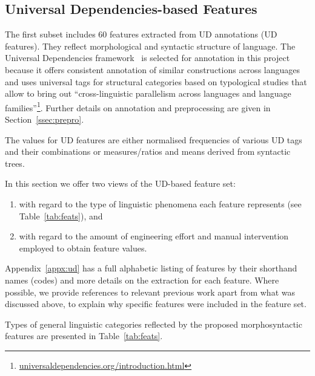 \subsection{\label{ssec:ud}Universal Dependencies-based Features}

The first subset includes 60 features extracted from \gls{UD} annotations (UD features). They reflect morphological and syntactic structure of language.
The Universal Dependencies framework~\cite{Straka2017} is selected for annotation in this project because it offers consistent annotation of similar constructions across languages and uses universal tags for structural categories based on typological studies that allow to bring out ``cross-linguistic parallelism across languages and language families''\footnote{\url{universaldependencies.org/introduction.html}}. Further details on annotation and preprocessing are given in Section~\ref{ssec:prepro}. 

The values for UD features are either normalised frequencies of various UD tags and their combinations or measures/ratios and means derived from syntactic trees. 

In this section we offer two views of the UD-based feature set: 
\begin{enumerate}\compresslist{}
	\item with regard to the type of linguistic phenomena each feature represents (see Table~\ref{tab:feats}), and 
	\item with regard to the amount of engineering effort and manual intervention employed to obtain feature values. 
\end{enumerate}

Appendix~\ref{appx:ud} has a full alphabetic listing of features by their shorthand names (codes) and more details on the extraction for each feature. Where possible, we provide references to relevant previous work apart from what was discussed above, to explain why specific features were included in the feature set. 

Types of general linguistic categories reflected by the proposed morphosyntactic features are presented in Table~\ref{tab:feats}. 

